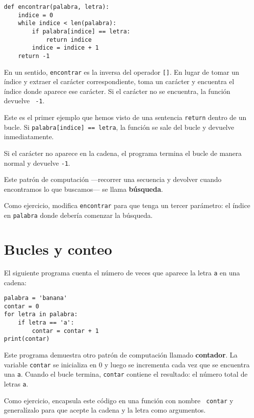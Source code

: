 \documentclass[10pt]{book}
\begin{document}
\begin{verbatim}
def encontrar(palabra, letra):
    indice = 0
    while indice < len(palabra):
        if palabra[indice] == letra:
            return indice
        indice = indice + 1
    return -1
\end{verbatim}
%
En un sentido, {\tt encontrar} es la inversa del operador {\tt []}.
En lugar de tomar un índice y extraer el carácter correspondiente,
toma un carácter y encuentra el índice donde aparece ese
carácter.  Si el carácter no se encuentra, la función devuelve {\tt
-1}.

Este es el primer ejemplo que hemos visto de una sentencia {\tt return}
dentro de un bucle.  Si {\tt palabra[indice] == letra}, la función se sale
del bucle y devuelve inmediatamente.

Si el carácter no aparece en la cadena, el programa
termina el bucle de manera normal y devuelve {\tt -1}.

Este patrón de computación ---recorrer una secuencia y devolver
cuando encontramos lo que buscamos--- se llama {\bf búsqueda}.

Como ejercicio, modifica {\tt encontrar} para que tenga un
tercer parámetro: el índice en {\tt palabra} donde debería comenzar la
búsqueda.


\section{Bucles y conteo}
\label{counter}

El siguiente programa cuenta el número de veces que aparece la letra {\tt a}
en una cadena:

\begin{verbatim}
palabra = 'banana'
contar = 0
for letra in palabra:
    if letra == 'a':
        contar = contar + 1
print(contar)
\end{verbatim}
%
Este programa demuestra otro patrón de computación llamado {\bf
contador}.  La variable {\tt contar} se inicializa en 0 y luego
se incrementa cada vez que se encuentra una {\tt a}.
Cuando el bucle termina, {\tt contar}
contiene el resultado: el número total de letras {\tt a}.

Como ejercicio, encapsula este código en una función con nombre {\tt
contar} y generalízalo para que acepte la cadena y la
letra como argumentos.
\end{document}
